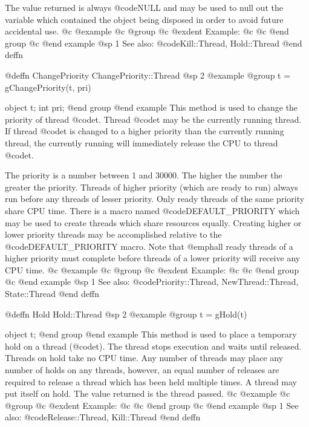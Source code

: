 The value returned is always @code{NULL} and may be used to null out
the variable which contained the object being disposed in order to
avoid future accidental use.
@c @example
@c @group
@c @exdent Example:
@c 
@c @end group
@c @end example
@sp 1
See also:  @code{Kill::Thread, Hold::Thread}
@end deffn













@deffn {ChangePriority} ChangePriority::Thread
@sp 2
@example
@group
t = gChangePriority(t, pri)

object  t;
int     pri;
@end group
@end example
This method is used to change the priority of thread @code{t}.
Thread @code{t} may be the currently running thread.  If thread
@code{t} is changed to a higher priority than the currently running
thread, the currently running will immediately release the CPU to thread
@code{t}.

The priority is a number between 1 and 30000.  The higher the number the
greater the priority.  Threads of higher priority (which are ready to
run) always run before any threads of lesser priority.  Only ready
threads of the same priority share CPU time.  There is a macro named
@code{DEFAULT_PRIORITY} which may be used to create threads which share
resources equally.  Creating higher or lower priority threads may be
accomplished relative to the @code{DEFAULT_PRIORITY} macro.  Note that
@emph{all} ready threads of a higher priority must complete before
threads of a lower priority will receive any CPU time.
@c @example
@c @group
@c @exdent Example:
@c 
@c @end group
@c @end example
@sp 1
See also:  @code{Priority::Thread, NewThread::Thread, State::Thread}
@end deffn











@deffn {Hold} Hold::Thread
@sp 2
@example
@group
t = gHold(t)

object  t;
@end group
@end example
This method is used to place a temporary hold on a thread (@code{t}).
The thread stops execution and waits until released.  Threads on hold
take no CPU time.  Any number of threads may place any number of holds
on any threads, however, an equal number of releases are required
to release a thread which has been held multiple times.  A thread
may put itself on hold.  The value returned is the thread passed.
@c @example
@c @group
@c @exdent Example:
@c 
@c @end group
@c @end example
@sp 1
See also:  @code{Release::Thread, Kill::Thread}
@end deffn












